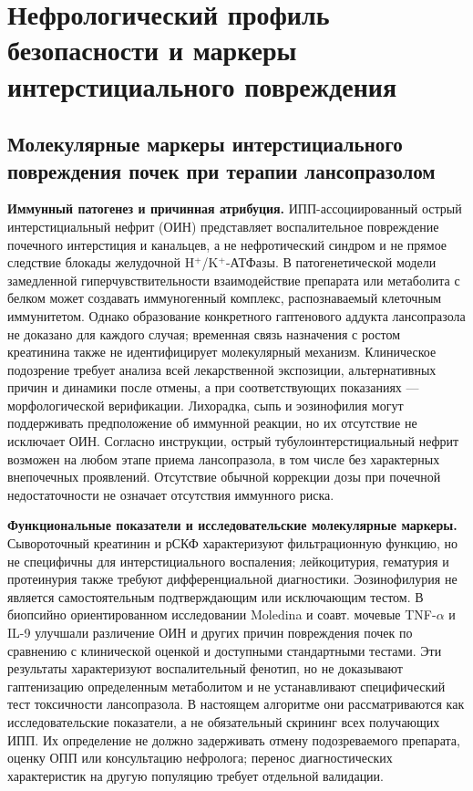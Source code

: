 \documentclass[11pt,a4paper,notitlepage]{report}
\newcommand{\src}[1]{\unskip\space\cite{#1}}
\begin{document}
\section{Нефрологический профиль безопасности и маркеры интерстициального повреждения}
\label{sec:nephrology}

\subsection{Молекулярные маркеры интерстициального повреждения почек при терапии лансопразолом}
\label{sec:renal-interstitial-markers}
\textbf{Иммунный патогенез и причинная атрибуция.} ИПП-ассоциированный острый интерстициальный нефрит (ОИН) представляет воспалительное повреждение почечного интерстиция и канальцев, а не нефротический синдром и не прямое следствие блокады желудочной H$^+$/K$^+$-АТФазы. В патогенетической модели замедленной гиперчувствительности взаимодействие препарата или метаболита с белком может создавать иммуногенный комплекс, распознаваемый клеточным иммунитетом. Однако образование конкретного гаптенового аддукта лансопразола не доказано для каждого случая; временная связь назначения с ростом креатинина также не идентифицирует молекулярный механизм. Клиническое подозрение требует анализа всей лекарственной экспозиции, альтернативных причин и динамики после отмены, а при соответствующих показаниях --- морфологической верификации.\src{safeain,uslabel,renalniceaki} Лихорадка, сыпь и эозинофилия могут поддерживать предположение об иммунной реакции, но их отсутствие не исключает ОИН. Согласно инструкции, острый тубулоинтерстициальный нефрит возможен на любом этапе приема лансопразола, в том числе без характерных внепочечных проявлений. Отсутствие обычной коррекции дозы при почечной недостаточности не означает отсутствия иммунного риска.\src{uslabel}

\textbf{Функциональные показатели и исследовательские молекулярные маркеры.} Сывороточный креатинин и рСКФ характеризуют фильтрационную функцию, но не специфичны для интерстициального воспаления; лейкоцитурия, гематурия и протеинурия также требуют дифференциальной диагностики. Эозинофилурия не является самостоятельным подтверждающим или исключающим тестом.\src{renalniceaki,renaleosin2013} В биопсийно ориентированном исследовании Moledina и соавт. мочевые TNF-$\alpha$ и IL-9 улучшали различение ОИН и других причин повреждения почек по сравнению с клинической оценкой и доступными стандартными тестами. Эти результаты характеризуют воспалительный фенотип, но не доказывают гаптенизацию определенным метаболитом и не устанавливают специфический тест токсичности лансопразола. В настоящем алгоритме они рассматриваются как исследовательские показатели, а не обязательный скрининг всех получающих ИПП. Их определение не должно задерживать отмену подозреваемого препарата, оценку ОПП или консультацию нефролога; перенос диагностических характеристик на другую популяцию требует отдельной валидации.\src{renalmarkers2019}
\end{document}
